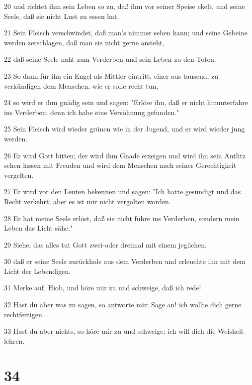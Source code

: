 \par 20 und richtet ihm sein Leben so zu, daß ihm vor seiner Speise ekelt, und seine Seele, daß sie nicht Lust zu essen hat.
\par 21 Sein Fleisch verschwindet, daß man's nimmer sehen kann; und seine Gebeine werden zerschlagen, daß man sie nicht gerne ansieht,
\par 22 daß seine Seele naht zum Verderben und sein Leben zu den Toten.
\par 23 So dann für ihn ein Engel als Mittler eintritt, einer aus tausend, zu verkündigen dem Menschen, wie er solle recht tun,
\par 24 so wird er ihm gnädig sein und sagen: "Erlöse ihn, daß er nicht hinunterfahre ins Verderben; denn ich habe eine Versöhnung gefunden."
\par 25 Sein Fleisch wird wieder grünen wie in der Jugend, und er wird wieder jung werden.
\par 26 Er wird Gott bitten; der wird ihm Gnade erzeigen und wird ihn sein Antlitz sehen lassen mit Freuden und wird dem Menschen nach seiner Gerechtigkeit vergelten.
\par 27 Er wird vor den Leuten bekennen und sagen: "Ich hatte gesündigt und das Recht verkehrt; aber es ist mir nicht vergolten worden.
\par 28 Er hat meine Seele erlöst, daß sie nicht führe ins Verderben, sondern mein Leben das Licht sähe."
\par 29 Siehe, das alles tut Gott zwei-oder dreimal mit einem jeglichen,
\par 30 daß er seine Seele zurückhole aus dem Verderben und erleuchte ihn mit dem Licht der Lebendigen.
\par 31 Merke auf, Hiob, und höre mir zu und schweige, daß ich rede!
\par 32 Hast du aber was zu sagen, so antworte mir; Sage an! ich wollte dich gerne rechtfertigen.
\par 33 Hast du aber nichts, so höre mir zu und schweige; ich will dich die Weisheit lehren.

\chapter{34}

